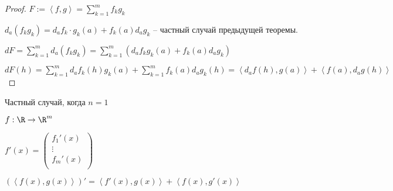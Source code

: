 \begin{proof}\slashns
    
    $F:= \left<f,g\right> = \sum\limits_{k = 1}^{m} f_k g_k$
    
    $d_a(f_k g_k) = d_a f_k \cdot g_k(a) + f_k(a) d_a g_k$ -- частный случай предыдущей теоремы.
    
    $dF = \sum\limits_{k = 1}^{m} d_a(f_k g_k) = \sum\limits_{k = 1}^{m} (d_a f_k g_k(a) + f_k(a) d_a g_k)$
    
    $dF(h) = \sum\limits_{k = 1}^{m}d_a f_k(h) g_k(a)+\sum\limits_{k = 1}^{m} f_k(a) d_ag_k(h) =  \left<d_a f(h), g(a)\right> + \left<f(a), d_a g(h)\right>$
\end{proof}

\begin{remark}\slashns
    
    Частный случай, когда $n = 1$
    
    $f: \R \to \R^m$
    
    $f'(x) = \begin{pmatrix}
    f_1'(x)\\\vdots\\f_m'(x)\\
    \end{pmatrix}$
    
    $(\left< f(x), g(x) \right> )' = \left<f'(x), g(x)\right> + \left<f(x), g'(x)\right>$
\end{remark}
